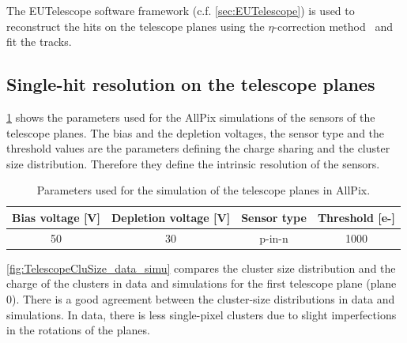 The EUTelescope software framework (c.f. \cref{sec:EUTelescope}) is
used to reconstruct the hits on the telescope planes using the
$\eta$-correction method~\cite{Belau:1983eh} and fit the tracks.

\subsection{Single-hit resolution on the telescope planes}

\cref{tab:AllPixTelescopePlanesParams} shows the parameters used for
the AllPix simulations of the sensors of the telescope planes. The
bias and the depletion voltages, the sensor type and the threshold
values are the parameters defining the charge sharing and the cluster
size distribution. Therefore they define the intrinsic resolution of
the sensors.

\begin{table}[htbp]
  \centering
  \caption{Parameters used for the simulation of the telescope planes in AllPix.}
  \label{tab:AllPixTelescopePlanesParams}
  \begin{tabular}{cccc}
    \toprule
    Bias voltage [V] & Depletion voltage [V] & Sensor type & Threshold [e-] \\
    \midrule
    50 & 30 & p-in-n & 1000 \\
    \bottomrule
  \end{tabular}
\end{table}


\cref{fig:TelescopeCluSize_data_simu} compares the cluster size
distribution and the charge of the clusters in data and simulations
for the first telescope plane (plane 0). There is a good agreement
between the cluster-size distributions in data and simulations. In
data, there is less single-pixel clusters due to slight imperfections
in the rotations of the planes.

